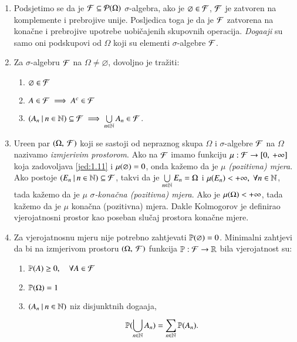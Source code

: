 \begin{nap} \label{nap:1.24}
    \begin{enumerate}[label=(\alph*)]
        \item Podsjetimo se da je $\mathcal{F} \subseteq \mathcal{P}({\Omega})$ $\sigma$-algebra, ako je $\varnothing \in \mathcal{F}$, $\mathcal{F}$ je zatvoren na komplemente i prebrojive unije. Posljedica toga je da je $\mathcal{F}$ zatvorena na kona\v cne i prebrojive upotrebe uobi\v cajenih skupovnih operacija.
        \emph{Doga\dj aji}  su samo oni podskupovi od $\Omega$ koji su elementi $\sigma$-algebre $\mathcal{F}$.
        \item Za $\sigma$-algebru $\mathcal{F}$ na $\Omega \neq  \varnothing$, dovoljno je tra\v ziti:
        \begin{enumerate}[label=(\roman*)]
            \item $\varnothing \in \mathcal{F}$
            \item $A \in \mathcal{F} \implies A^c \in \mathcal{F}$
            \item $({A_n} \: | \: {n \in \mathbb{N}}) \subseteq \mathcal{F} \implies \bigcup\limits_{n \in \mathbb{N}}^{} A_n \in \mathcal{F}$.
        \end{enumerate}
        \item Ure\dj en par $(\Omega, \: \mathcal{F})$ koji se sastoji od nepraznog skupa $\Omega$ i $\sigma$-algebre $\mathcal{F}$ na $\Omega$ nazivamo \emph{izmjerivim prostorom}.
        Ako na $\mathcal{F}$ imamo funkciju $\mu : \mathcal{F} \to [{0}, \:{+ \infty}]$ koja zadovoljava \eqref{jed:1.11} i $\mu({\varnothing}) = 0$, onda ka\v zemo da je $\mu$ \emph{(pozitivna) mjera}.
        Ako postoje $({E_n} \: | \: {n \in \mathbb{N}}) \subseteq \mathcal{F}$, takvi da je $\bigcup\limits_{n \in \mathbb{N}}^{} E_n = \Omega$ i $\mu({E_n}) < +\infty, \; \forall n \in \mathbb{N}$, tada ka\v zemo da je $\mu$ \emph{$\sigma$-kona\v cna (pozitivna) mjera}.
        Ako je $\mu({\Omega}) < +\infty$, tada ka\v zemo da je $\mu$ kona\v cna (pozitivna) mjera.
        Dakle Kolmogorov je definirao vjerojatnosni prostor kao poseban slu\v caj prostora kona\v cne mjere.
        \item Za vjerojatnosnu mjeru nije potrebno zahtjevati $\mathbb{P}({\varnothing}) = 0$.
        Minimalni zahtjevi da bi na izmjerivom prostoru $(\Omega, \: \mathcal{F})$ funkcija $\mathbb{P}: \mathcal{F} \to \mathbb{R}$ bila vjerojatnost su:
        \begin{enumerate}[label=(\roman*)]
            \item $\mathbb{P}({A}) \geq 0, \quad \forall A \in \mathcal{F}$
            \item $\mathbb{P}({\Omega}) = 1$
            \item $({A_n} \: | \: {n \in \mathbb{N}})$ niz disjunktnih doga\dj aja,
            \begin{equation*}
                \mathbb{P}({\bigcup\limits_{n \in \mathbb{N}}^{} A_n}) = \sum\limits_{n \in \mathbb{N}}^{} \mathbb{P}({A_n}).
            \end{equation*}
        \end{enumerate}
    \end{enumerate}
\end{nap}

\begin{tm}  \label{tm:1.24-1}
    
\end{tm}